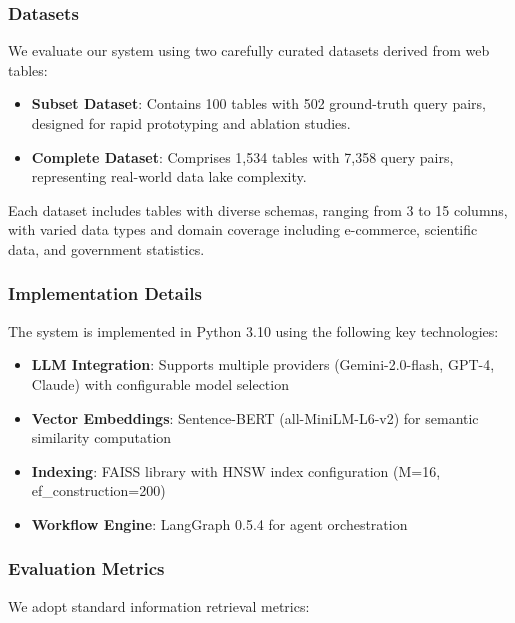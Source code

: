 \documentclass[conference]{IEEEtran}
\begin{document}
\subsubsection{Datasets}

We evaluate our system using two carefully curated datasets derived from web tables:

\begin{itemize}
    \item \textbf{Subset Dataset}: Contains 100 tables with 502 ground-truth query pairs, designed for rapid prototyping and ablation studies.
    \item \textbf{Complete Dataset}: Comprises 1,534 tables with 7,358 query pairs, representing real-world data lake complexity.
\end{itemize}

Each dataset includes tables with diverse schemas, ranging from 3 to 15 columns, with varied data types and domain coverage including e-commerce, scientific data, and government statistics.

\subsubsection{Implementation Details}

The system is implemented in Python 3.10 using the following key technologies:

\begin{itemize}
    \item \textbf{LLM Integration}: Supports multiple providers (Gemini-2.0-flash, GPT-4, Claude) with configurable model selection
    \item \textbf{Vector Embeddings}: Sentence-BERT (all-MiniLM-L6-v2) for semantic similarity computation
    \item \textbf{Indexing}: FAISS library with HNSW index configuration (M=16, ef\_construction=200)
    \item \textbf{Workflow Engine}: LangGraph 0.5.4 for agent orchestration
\end{itemize}

\subsubsection{Evaluation Metrics}

We adopt standard information retrieval metrics:
\end{document}
